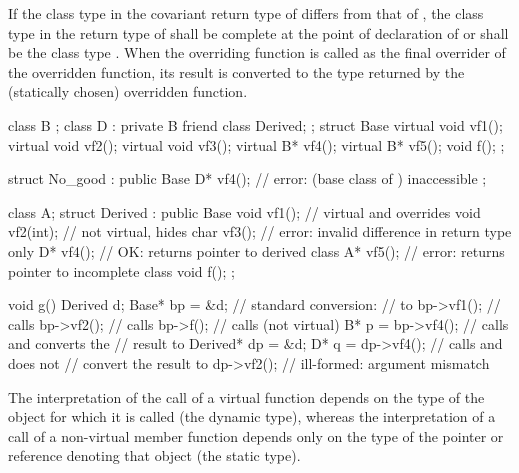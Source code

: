 \pnum
If the class type in the covariant return type of  differs from that of
, the class type in the return type of  shall be
complete at the point of declaration of  or shall be the
class type . When the overriding function is called as the
final overrider of the overridden function, its result is converted to
the type returned by the (statically chosen) overridden
function.
\begin{example}
\begin{codeblock}
class B { };
class D : private B { friend class Derived; };
struct Base {
  virtual void vf1();
  virtual void vf2();
  virtual void vf3();
  virtual B*   vf4();
  virtual B*   vf5();
  void f();
};

struct No_good : public Base {
  D*  vf4();        // error:  (base class of ) inaccessible
};

class A;
struct Derived : public Base {
    void vf1();     // virtual and overrides 
    void vf2(int);  // not virtual, hides 
    char vf3();     // error: invalid difference in return type only
    D*   vf4();     // OK: returns pointer to derived class
    A*   vf5();     // error: returns pointer to incomplete class
    void f();
};

void g() {
  Derived d;
  Base* bp = &d;                // standard conversion:
                                //  to 
  bp->vf1();                    // calls 
  bp->vf2();                    // calls 
  bp->f();                      // calls  (not virtual)
  B*  p = bp->vf4();            // calls  and converts the
                                // result to 
  Derived*  dp = &d;
  D*  q = dp->vf4();            // calls  and does not
                                // convert the result to 
  dp->vf2();                    // ill-formed: argument mismatch
}
\end{codeblock}
\end{example}

\pnum
\begin{note}
The interpretation of the call of a virtual function depends on the type
of the object for which it is called (the dynamic type), whereas the
interpretation of a call of a non-virtual member function depends only
on the type of the pointer or reference denoting that object (the static
type).
\end{note}

